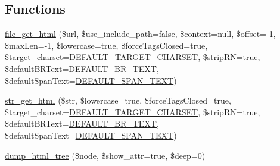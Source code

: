 \subsection*{Functions}
\begin{DoxyCompactItemize}
\item 
\hyperlink{simple__html__dom_8php_af2164941db8b68168c1105687e179d27}{file\+\_\+get\+\_\+html} (\$url, \$use\+\_\+include\+\_\+path=false, \$context=null, \$offset=-\/1, \$max\+Len=-\/1, \$lowercase=true, \$force\+Tags\+Closed=true, \$target\+\_\+charset=\hyperlink{simple__html__dom_8php_aeb01f6d83a65d695ad327473f838319a}{D\+E\+F\+A\+U\+L\+T\+\_\+\+T\+A\+R\+G\+E\+T\+\_\+\+C\+H\+A\+R\+S\+E\+T}, \$strip\+R\+N=true, \$default\+B\+R\+Text=\hyperlink{simple__html__dom_8php_a898bdf60fe4d05c1c50013eed5e2c6e8}{D\+E\+F\+A\+U\+L\+T\+\_\+\+B\+R\+\_\+\+T\+E\+X\+T}, \$default\+Span\+Text=\hyperlink{simple__html__dom_8php_a30d58d7d3a53efc61f064b53a434bafe}{D\+E\+F\+A\+U\+L\+T\+\_\+\+S\+P\+A\+N\+\_\+\+T\+E\+X\+T})
\item 
\hyperlink{simple__html__dom_8php_a2a9c7626f0cb0a56eb81709124a08922}{str\+\_\+get\+\_\+html} (\$str, \$lowercase=true, \$force\+Tags\+Closed=true, \$target\+\_\+charset=\hyperlink{simple__html__dom_8php_aeb01f6d83a65d695ad327473f838319a}{D\+E\+F\+A\+U\+L\+T\+\_\+\+T\+A\+R\+G\+E\+T\+\_\+\+C\+H\+A\+R\+S\+E\+T}, \$strip\+R\+N=true, \$default\+B\+R\+Text=\hyperlink{simple__html__dom_8php_a898bdf60fe4d05c1c50013eed5e2c6e8}{D\+E\+F\+A\+U\+L\+T\+\_\+\+B\+R\+\_\+\+T\+E\+X\+T}, \$default\+Span\+Text=\hyperlink{simple__html__dom_8php_a30d58d7d3a53efc61f064b53a434bafe}{D\+E\+F\+A\+U\+L\+T\+\_\+\+S\+P\+A\+N\+\_\+\+T\+E\+X\+T})
\item 
\hyperlink{simple__html__dom_8php_a1f67414b1908776b16f3fc8c6953c13f}{dump\+\_\+html\+\_\+tree} (\$node, \$show\+\_\+attr=true, \$deep=0)
\end{DoxyCompactItemize}
